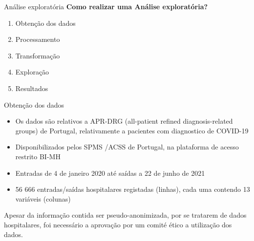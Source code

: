\documentclass[pdf]
{beamer}
\begin{document}
\begin{frame}{Análise exploratória}
\textbf{\Large Como realizar uma Análise exploratória?}
\vspace{0.2cm}
\begin{enumerate}
\item<2-> Obtenção dos dados
\item<3-> Processamento
\item<4-> Transformação
\item<5-> Exploração
\item<6-> Resultados
\end{enumerate}
\end{frame}

\begin{frame}{Obtenção dos dados}
\vspace{0.4cm}
\begin{itemize}
\item Os dados são relativos a APR-DRG (all-patient refined diagnosis-related groups) de Portugal, relativamente a pacientes com diagnostico de COVID-19
\item Disponibilizados pelos SPMS /ACSS de Portugal, na plataforma de acesso restrito BI-MH
\item Entradas de 4 de janeiro 2020 até saídas a 22 de junho de 2021
\item 56 666 entradas/saídas hospitalares registadas (linhas), cada uma contendo 13 variáveis (colunas)
\end{itemize}
\vspace{0.4cm}
Apesar da informação contida ser pseudo-anonimizada, por se tratarem de dados hospitalares, \alert{foi necessário a aprovação por um comité ético} a utilização dos dados.
\end{frame}
\end{document}
